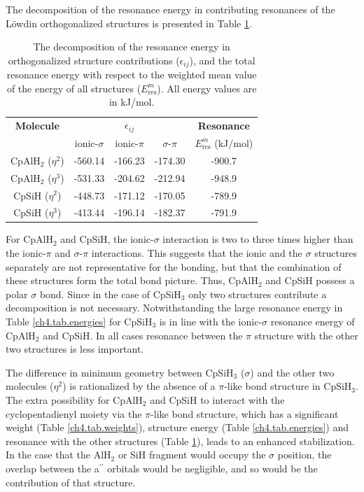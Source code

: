 The decomposition of the resonance energy in contributing resonances of the L\"{o}wdin orthogonalized structures \cite{havenith} is presented in Table \ref{ch4.tab.interactions}.
\begin{table}[htbp]
\caption{The decomposition of the resonance energy in orthogonalized structure contributions ($\epsilon_{ij}$), and the total resonance energy with respect to the weighted mean value of the energy of all structures ($E^m_\mathrm{res}$). All energy values are in kJ/mol.}
\center
\begin{tabular}{|c|ccc|c|}
\hline
\textbf{Molecule}&\multicolumn{3}{c|}{$\epsilon_{ij}$}&\textbf{Resonance}\\
&ionic-$\sigma$&ionic-$\pi$&$\sigma$-$\pi$&$E^m_\mathrm{res}$ (kJ/mol)\\
\hline
CpAlH$_2$ ($\eta^{2}$)& -560.14& -166.23& -174.30& -900.7\\
CpAlH$_2$ ($\eta^{3}$)& -531.33& -204.62& -212.94& -948.9\\
CpSiH ($\eta^{2}$)& -448.73& -171.12& -170.05& -789.9\\
CpSiH ($\eta^{3}$)& -413.44& -196.14& -182.37& -791.9\\

\hline
\end{tabular}
\label{ch4.tab.interactions}
\end{table}
For CpAlH$_2$ and CpSiH, the ionic-$\sigma$ interaction is two to three times higher than the ionic-$\pi$ and $\sigma$-$\pi$ interactions. This suggests that the ionic and the $\sigma$ structures separately are not representative for the bonding, but that the combination of these structures form the total bond picture. Thus, CpAlH$_2$ and CpSiH possess a polar $\sigma$ bond. Since in the case of CpSiH$_3$ only two structures contribute a decomposition is not necessary. Notwithstanding the large resonance energy in Table \ref{ch4.tab.energies} for CpSiH$_3$ is in line with the ionic-$\sigma$ resonance energy of CpAlH$_2$ and CpSiH. In all cases resonance between the $\pi$ structure with the other two structures is less important.

The difference in minimum geometry between CpSiH$_3$ ($\sigma$) and the other two molecules ($\eta^2$) is rationalized by the absence of a $\pi$-like bond structure in CpSiH$_3$. The extra possibility for CpAlH$_2$ and CpSiH to interact with the cyclopentadienyl moiety via the $\pi$-like bond structure, which has a significant weight (Table \ref{ch4.tab.weights}), structure energy (Table \ref{ch4.tab.energies}) and resonance with the other structures (Table \ref{ch4.tab.interactions}), leads to an enhanced stabilization. In the case that the AlH$_2$ or SiH fragment would occupy the $\sigma$ position, the overlap between the a$^{\prime\prime}$ orbitals would be negligible, and so would be the contribution of that structure.  

